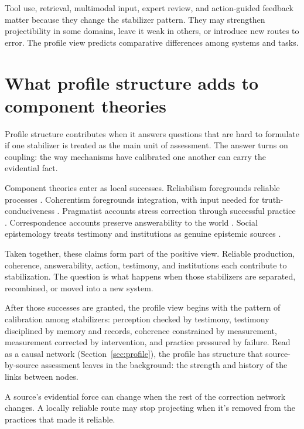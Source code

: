 \documentclass[12pt]{article}
\begin{document}
Tool use, retrieval, multimodal input, expert review, and action-guided feedback matter
because they change the stabilizer pattern. They may strengthen projectibility in some
domains, leave it weak in others, or introduce new routes to error. The profile view
predicts comparative differences among systems and tasks.

\section{What profile structure adds to component theories}\label{sec:adjudication}

Profile structure contributes when it answers questions that are hard to formulate if one
stabilizer is treated as the main unit of assessment. The answer turns on coupling: the way
mechanisms have calibrated one another can carry the evidential fact.

Component theories enter as local successes. Reliabilism foregrounds reliable processes
\citep{goldman_1979_what_is_justified_belief}. Coherentism foregrounds integration,
with input needed for truth-conduciveness
\citep{bonjour_1985_structure_empirical_knowledge}.
Pragmatist accounts stress correction through successful practice
\citep{james_1907_pragmatism,dewey_1941_propositions_warranted_assertibility_truth}.
Correspondence accounts preserve answerability to the world
\citep{david_1994_correspondence_disquotation,kirkham_1992_theories_truth}. Social
epistemology treats testimony and institutions as genuine epistemic sources
\citep{coady_1992_testimony,lackey_2008_learning_from_words,goldberg_2010_relying_on_others}.

Taken together, these claims form part of the positive view. Reliable production,
coherence, answerability, action, testimony, and institutions each contribute to
stabilization. The question is what happens when those stabilizers are separated,
recombined, or moved into a new system.

After those successes are granted, the profile view begins with the pattern of
calibration among stabilizers: perception checked by testimony, testimony disciplined by
memory and records, coherence constrained by measurement, measurement corrected by
intervention, and practice pressured by failure. Read as a causal network
(Section~\ref{sec:profile}), the profile has structure that source-by-source assessment
leaves in the background: the strength and history of the links between nodes.

A source's evidential force can change when the rest of the correction network changes.
A locally reliable route may stop projecting when it's
removed from the practices that made it reliable.
\end{document}
